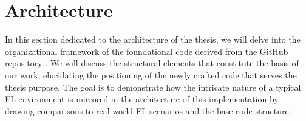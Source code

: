 \section{Architecture}
In this section dedicated to the architecture of the thesis, we will delve into the organizational framework of the foundational code derived from the GitHub repository \cite{LFighter_code}. We will discuss the structural elements that constitute the basis of our work, elucidating the positioning of the newly crafted code that serves the thesis purpose. The goal is to demonstrate how the intricate nature of a typical FL environment is mirrored in the architecture of this implementation by drawing comparisons to real-world FL scenarios and the base code structure.

